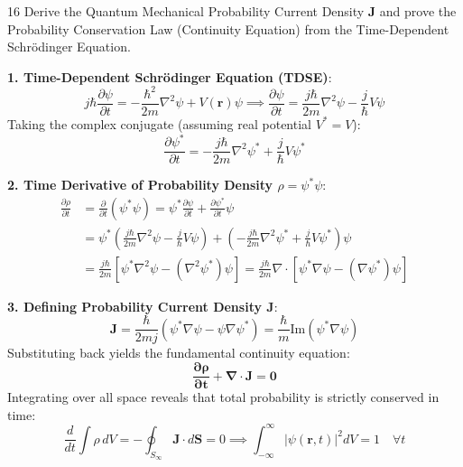 \begin{theoryq}{16}
Derive the Quantum Mechanical Probability Current Density $\mathbf{J}$ and prove the Probability Conservation Law (Continuity Equation) from the Time-Dependent Schrödinger Equation.
\end{theoryq}
\begin{theorysol}
\textbf{1. Time-Dependent Schrödinger Equation (TDSE)}:
\begin{equation}
j\hbar \frac{\partial \psi}{\partial t} = -\frac{\hbar^2}{2m}\nabla^2\psi + V(\mathbf{r})\psi \implies \frac{\partial \psi}{\partial t} = \frac{j\hbar}{2m}\nabla^2\psi - \frac{j}{\hbar}V\psi
\end{equation}
Taking the complex conjugate (assuming real potential $V^* = V$):
\begin{equation}
\frac{\partial \psi^*}{\partial t} = -\frac{j\hbar}{2m}\nabla^2\psi^* + \frac{j}{\hbar}V\psi^*
\end{equation}

\textbf{2. Time Derivative of Probability Density $\rho = \psi^* \psi$}:
\begin{align*}
\frac{\partial \rho}{\partial t} &= \frac{\partial}{\partial t}(\psi^* \psi) = \psi^* \frac{\partial \psi}{\partial t} + \frac{\partial \psi^*}{\partial t}\psi \\
&= \psi^* \left(\frac{j\hbar}{2m}\nabla^2\psi - \frac{j}{\hbar}V\psi\right) + \left(-\frac{j\hbar}{2m}\nabla^2\psi^* + \frac{j}{\hbar}V\psi^*\right)\psi \\
&= \frac{j\hbar}{2m} \left[\psi^* \nabla^2\psi - (\nabla^2\psi^*)\psi\right] = \frac{j\hbar}{2m} \nabla \cdot \left[\psi^* \nabla\psi - (\nabla\psi^*)\psi\right]
\end{align*}

\textbf{3. Defining Probability Current Density $\mathbf{J}$}:
\begin{equation}
\mathbf{J} = \frac{\hbar}{2mj} \left(\psi^* \nabla\psi - \psi \nabla\psi^*\right) = \frac{\hbar}{m}\text{Im}(\psi^* \nabla\psi)
\end{equation}
Substituting back yields the fundamental continuity equation:
\begin{equation}
\mathbf{\frac{\partial \rho}{\partial t} + \nabla \cdot \mathbf{J} = 0}
\end{equation}
Integrating over all space reveals that total probability is strictly conserved in time:
\begin{equation}
\frac{d}{dt}\int \rho\, dV = -\oint_{S_\infty} \mathbf{J} \cdot d\mathbf{S} = 0 \implies \int_{-\infty}^\infty |\psi(\mathbf{r},t)|^2 dV = 1\quad \forall t
\end{equation}
\end{theorysol}
\vspace{4mm}

